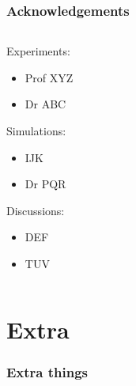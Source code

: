 \documentclass[xcolor=dvipsnames]{beamer}
\begin{document}
\begin{frame}

\frametitle{Acknowledgements}
\begin{columns}

\begin{column}{0.3\textwidth}
\footnotesize{

{\large{\color{RoyalPurple} Experiments:}}

\begin{itemize}
\item Prof XYZ
\item Dr ABC
\end{itemize}

{\large{\color{RoyalPurple} Simulations:}}

\begin{itemize}
\item IJK\footnotemark[1]
\item Dr PQR\footnotemark[2]
\end{itemize}

{\large{\color{RoyalPurple} Discussions:}}

\begin{itemize}
\item DEF
\item TUV
\end{itemize}
}
\end{column}

\begin{column}{0.5\textwidth}
\end{column}

\end{columns}


\vspace{1 em}
\begin{columns}


\begin{column}{0.08\textwidth}
\end{column}

\begin{column}{0.18\textwidth}
\end{column}

\begin{column}{0.14\textwidth}
\end{column}

\end{columns}  
 
 
\end{frame}


\section{Extra}

\begin{frame}[noframenumbering]
\frametitle{Extra things}

\end{frame}
\end{document}
